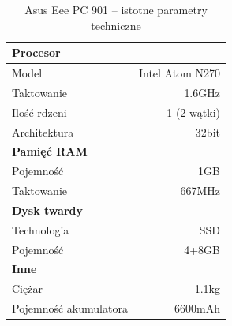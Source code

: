 \begin{table}[h!]
\caption{Asus Eee PC 901 -- istotne parametry techniczne}
\centering
\small
\begin{tabular*}{0.6\textwidth}{@{\extracolsep{\fill}} lr}
\toprule
\textbf{Procesor}\\
\midrule
Model & Intel Atom N270\\
Taktowanie & 1.6GHz\\
Ilość rdzeni & 1 (2 wątki)\\
Architektura & 32bit \\
\midrule
\textbf{Pamięć RAM} \\
\midrule
Pojemność & 1GB \\
Taktowanie & 667MHz \\
\midrule
\textbf{Dysk twardy} \\
\midrule
Technologia & SSD \\
Pojemność & 4+8GB \\
\midrule
\textbf{Inne} \\
\midrule
Ciężar & 1.1kg \\
Pojemność akumulatora & 6600mAh \\
\bottomrule
\end{tabular*}
\label{tab:eee_params}
\end{table}


